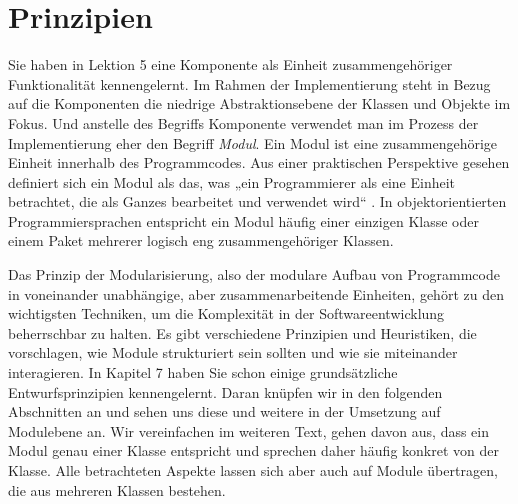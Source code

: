\section{Prinzipien}
\label{sec:Kap-9.1}

Sie haben in Lektion 5 eine Komponente als Einheit zusammengehöriger Funktionalität kennengelernt. Im Rahmen der Implementierung steht in Bezug auf die Komponenten die niedrige Abstraktionsebene der Klassen und Objekte im Fokus. Und anstelle des Begriffs Komponente verwendet man im Prozess der Implementierung eher den Begriff \textit{Modul}. Ein Modul ist eine zusammengehörige Einheit innerhalb des Programmcodes. Aus einer praktischen Perspektive gesehen definiert sich ein Modul als das, was „ein Programmierer als eine Einheit betrachtet, die als Ganzes bearbeitet und verwendet wird“ \cite[42]{lah18}. In objektorientierten Programmiersprachen entspricht ein Modul häufig einer einzigen Klasse oder einem Paket mehrerer logisch eng zusammengehöriger Klassen. 

Das Prinzip der Modularisierung,  also der modulare Aufbau von Programmcode in voneinander unabhängige, aber zusammenarbeitende Einheiten, gehört zu den wichtigsten Techniken, um die Komplexität in der Softwareentwicklung beherrschbar zu halten. Es gibt verschiedene Prinzipien und Heuristiken, die vorschlagen, wie Module strukturiert sein sollten und wie sie miteinander interagieren. In Kapitel 7 haben Sie schon einige grundsätzliche Entwurfsprinzipien kennengelernt. Daran knüpfen wir in den folgenden Abschnitten an und sehen uns diese und weitere in der Umsetzung auf Modulebene an. Wir vereinfachen im weiteren Text, gehen davon aus, dass ein Modul genau einer Klasse entspricht und sprechen daher häufig konkret von der Klasse. Alle betrachteten Aspekte lassen sich aber auch auf Module übertragen, die aus mehreren Klassen bestehen.


